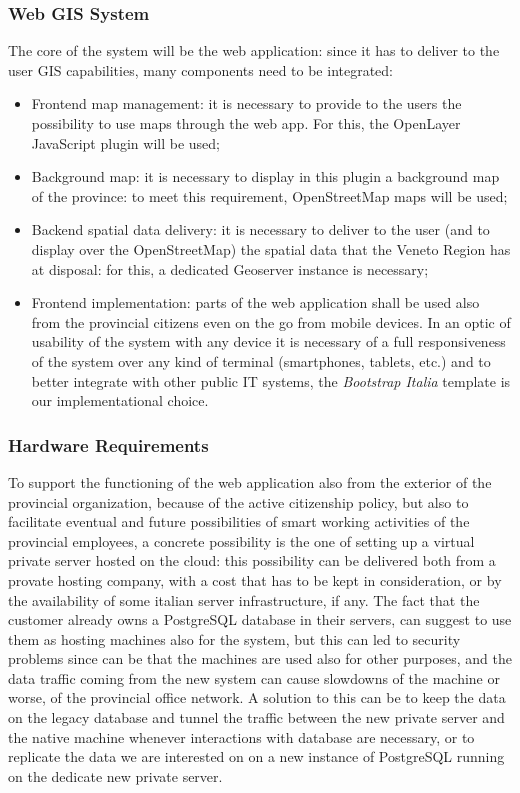 \subsubsection{Web GIS System}
The core of the system will be the web application: since it has to deliver to the user GIS capabilities, many components need to be integrated:
\begin{itemize}
    \item Frontend map management: it is necessary to provide to the users the possibility to use maps through the web app. For this, the OpenLayer JavaScript plugin will be used;
    \item Background map: it is necessary to display in this plugin a background map of the province: to meet this requirement, OpenStreetMap maps will be used;
    \item Backend spatial data delivery: it is necessary to deliver to the user (and to display over the OpenStreetMap) the spatial data that the Veneto Region has at disposal: for this, a dedicated Geoserver instance is necessary;
    \item Frontend implementation: parts of the web application shall be used also from the provincial citizens even on the go from mobile devices. In an optic of usability of the system with any device it is necessary of a full responsiveness of the system over any kind of terminal (smartphones, tablets, etc.) and to better integrate with other public IT systems, the \textit{Bootstrap Italia} template is our implementational choice.
\end{itemize}

\subsubsection{Hardware Requirements}
To support the functioning of the web application also from the exterior of the provincial organization, because of the active citizenship policy, but also to facilitate eventual and future possibilities of smart working activities of the provincial employees, a concrete possibility is the one of setting up a virtual private server hosted on the cloud: this possibility can be delivered both from a provate hosting company, with a cost that has to be kept in consideration, or by the availability of some italian server infrastructure, if any.
The fact that the customer already owns a PostgreSQL database in their servers, can suggest to use them as hosting machines also for the system, but this can led to security problems since can be that the machines are used also for other purposes, and the data traffic coming from the new system can cause slowdowns of the machine or worse, of the provincial office network. A solution to this can be to keep the data on the legacy database and tunnel the traffic between the new private server and the native machine whenever interactions with database are necessary, or to replicate the data we are interested on on a new instance of PostgreSQL running on the dedicate new private server.


